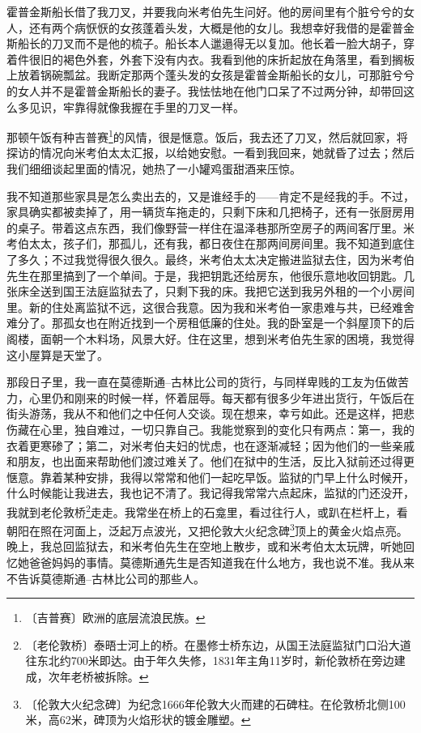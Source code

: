 \documentclass[12pt,UTF-8,openany]{ctexbook}
\begin{document}
\begin{normalsize}
    霍普金斯船长借了我刀叉，并要我向米考伯先生问好。他的房间里有个脏兮兮的女人，还有两个病恹恹的女孩蓬着头发，大概是他的女儿。我想幸好我借的是霍普金斯船长的刀叉而不是他的梳子。船长本人邋遢得无以复加。他长着一脸大胡子，穿着件很旧的褐色外套，外套下没有内衣。我看到他的床折起放在角落里，看到搁板上放着锅碗瓢盆。我断定那两个蓬头发的女孩是霍普金斯船长的女儿，可那脏兮兮的女人并不是霍普金斯船长的妻子。我怯怯地在他门口呆了不过两分钟，却带回这么多见识，牢靠得就像我握在手里的刀叉一样。
    
    那顿午饭有种吉普赛\footnote{〔吉普赛〕欧洲的底层流浪民族。}的风情，很是惬意。饭后，我去还了刀叉，然后就回家，将探访的情况向米考伯太太汇报，以给她安慰。一看到我回来，她就昏了过去；然后我们细细谈起里面的情况，她热了一小罐鸡蛋甜酒来压惊。
    
    我不知道那些家具是怎么卖出去的，又是谁经手的——肯定不是经我的手。不过，家具确实都被卖掉了，用一辆货车拖走的，只剩下床和几把椅子，还有一张厨房用的桌子。带着这点东西，我们像野营一样住在温泽巷那所空房子的两间客厅里。米考伯太太，孩子们，那孤儿，还有我，都日夜住在那两间房间里。我不知道到底住了多久；不过我觉得很久很久。最终，米考伯太太决定搬进监狱去住，因为米考伯先生在那里搞到了一个单间。于是，我把钥匙还给房东，他很乐意地收回钥匙。几张床全送到国王法庭监狱去了，只剩下我的床。我把它送到我另外租的一个小房间里。新的住处离监狱不远，这很合我意。因为我和米考伯一家患难与共，已经难舍难分了。那孤女也在附近找到一个房租低廉的住处。我的卧室是一个斜屋顶下的后阁楼，面朝一个木料场，风景大好。住在这里，想到米考伯先生家的困境，我觉得这小屋算是天堂了。
    
    那段日子里，我一直在莫德斯通–古林比公司的货行，与同样卑贱的工友为伍做苦力，心里仍和刚来的时候一样，怀着屈辱。每天都有很多少年进出货行，午饭后在街头游荡，我从不和他们之中任何人交谈。现在想来，幸亏如此。还是这样，把悲伤藏在心里，独自难过，一切只靠自己。我能觉察到的变化只有两点：第一，我的衣着更寒碜了；第二，对米考伯夫妇的忧虑，也在逐渐减轻；因为他们的一些亲戚和朋友，也出面来帮助他们渡过难关了。他们在狱中的生活，反比入狱前还过得更惬意。靠着某种安排，我得以常常和他们一起吃早饭。监狱的门早上什么时候开，什么时候能让我进去，我也记不清了。我记得我常常六点起床，监狱的门还没开，我就到老伦敦桥\footnote{〔老伦敦桥〕泰晤士河上的桥。在墨修士桥东边，从国王法庭监狱门口沿大道往东北约700米即达。由于年久失修，1831年主角11岁时，新伦敦桥在旁边建成，次年老桥被拆除。}走走。我常坐在桥上的石龛里，看过往行人，或趴在栏杆上，看朝阳在照在河面上，泛起万点波光，又把伦敦大火纪念碑\footnote{〔伦敦大火纪念碑〕为纪念1666年伦敦大火而建的石碑柱。在伦敦桥北侧100米，高62米，碑顶为火焰形状的镀金雕塑。}顶上的黄金火焰点亮。晚上，我总回监狱去，和米考伯先生在空地上散步，或和米考伯太太玩牌，听她回忆她爸爸妈妈的事情。莫德斯通先生是否知道我在什么地方，我也说不准。我从来不告诉莫德斯通–古林比公司的那些人。
    

\end{normalsize}
\end{document}
